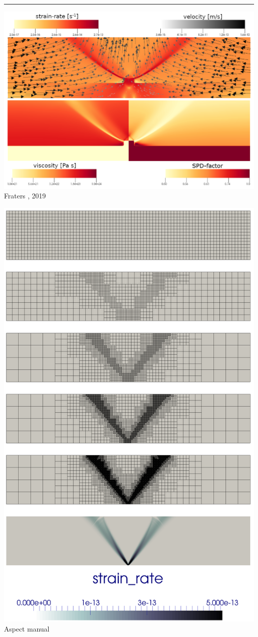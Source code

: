 \begin{center}\noindent\rule{12cm}{0.4pt}\end{center}

\begin{center}
\begin{minipage}{0.45\textwidth}
\centering
\includegraphics[height=0.8\textwidth]{images/benchmark_brick/frbt19}\\
{\captionfont Fraters \etal, 2019 \cite{frbt19}}
\end{minipage}\hfill
\begin{minipage}{0.45\textwidth}
\centering
\includegraphics[height=0.8\textwidth]{images/benchmark_brick/aspectmanual}\\
{\captionfont Aspect manual \cite{aspectmanual}}
\end{minipage}
\end{center}



